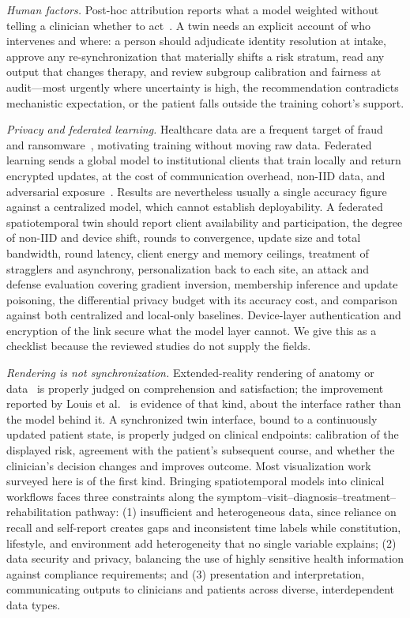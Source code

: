 \documentclass[journal]{IEEEtran}
\begin{document}
\emph{Human factors.} Post-hoc attribution reports what a model weighted without telling a clinician whether to act~\cite{rudin2019stopexplaining,tonekaboni2019clinicians}. A twin needs an explicit account of who intervenes and where: a person should adjudicate identity resolution at intake, approve any re-synchronization that materially shifts a risk stratum, read any output that changes therapy, and review subgroup calibration and fairness at audit---most urgently where uncertainty is high, the recommendation contradicts mechanistic expectation, or the patient falls outside the training cohort's support.

\emph{Privacy and federated learning.} Healthcare data are a frequent target of fraud and ransomware~\cite{Seh2020HealthcareDataBreaches}, motivating training without moving raw data. Federated learning sends a global model to institutional clients that train locally and return encrypted updates, at the cost of communication overhead, non-IID data, and adversarial exposure~\cite{prayitno2021FLhealthcare,aouedi2022FLmedical}. Results are nevertheless usually a single accuracy figure against a centralized model, which cannot establish deployability. A federated spatiotemporal twin should report client availability and participation, the degree of non-IID and device shift, rounds to convergence, update size and total bandwidth, round latency, client energy and memory ceilings, treatment of stragglers and asynchrony, personalization back to each site, an attack and defense evaluation covering gradient inversion, membership inference and update poisoning, the differential privacy budget with its accuracy cost, and comparison against both centralized and local-only baselines. Device-layer authentication and encryption of the link secure what the model layer cannot. We give this as a checklist because the reviewed studies do not supply the fields.

\emph{Rendering is not synchronization.} Extended-reality rendering of anatomy or data~\cite{Auvinet2018AR} is properly judged on comprehension and satisfaction; the improvement reported by Louis et al.~\cite{Louis2021VR} is evidence of that kind, about the interface rather than the model behind it. A synchronized twin interface, bound to a continuously updated patient state, is properly judged on clinical endpoints: calibration of the displayed risk, agreement with the patient's subsequent course, and whether the clinician's decision changes and improves outcome. Most visualization work surveyed here is of the first kind.
\else
Bringing spatiotemporal models into clinical workflows faces three constraints along the symptom--visit--diagnosis--treatment--rehabilitation pathway: (1) insufficient and heterogeneous data, since reliance on recall and self-report creates gaps and inconsistent time labels while constitution, lifestyle, and environment add heterogeneity that no single variable explains; (2) data security and privacy, balancing the use of highly sensitive health information against compliance requirements; and (3) presentation and interpretation, communicating outputs to clinicians and patients across diverse, interdependent data types.
\end{document}
